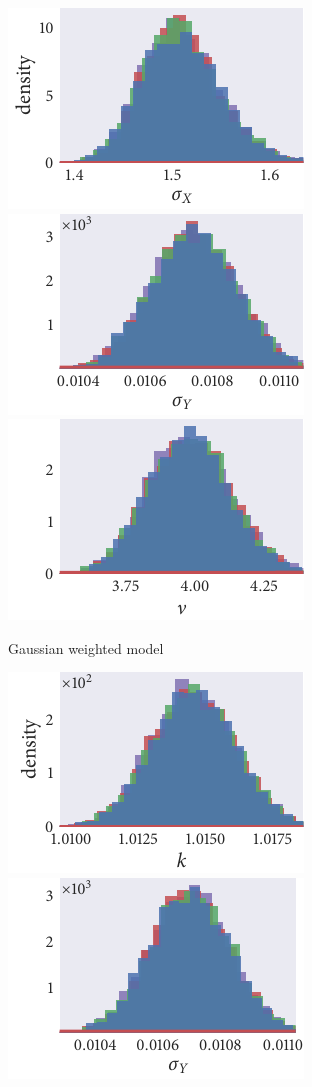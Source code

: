 \begin{figure}[p]
\begin{subfigure}[b]{\textwidth}
    \includegraphics{seq1/gauss_hist_sigma_X.pdf}%
    \includegraphics{seq1/gauss_hist_sigma_Y.pdf}%
    \includegraphics{seq1/gauss_hist_nu.pdf}
    \caption{Gaussian weighted model}
  \end{subfigure}
  \begin{subfigure}[b]{\textwidth}
    \includegraphics{seq1/top_hist_k.pdf}%
    \includegraphics{seq1/top_hist_sigma_Y.pdf}%

\end{subfigure}
\end{figure}
